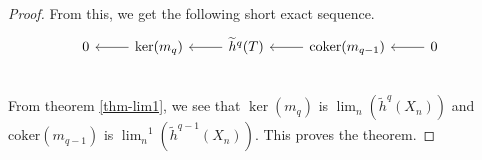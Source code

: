 \documentclass[12pt, notitlepage]{article}
\theoremstyle{definition}
\newcommand{\redco}{\widetilde{h}}
\newcommand{\coker}{\mathrm{coker}}
\begin{document}
\begin{proof}
  From this, we get the following short exact sequence.
  \[
    \begin{tikzcd}
      0 & \ker(m_q) \ar[l] & \redco^{q}(T) \ar[l] & \coker(m_{q-1}) \ar[l] & 0 \ar[l] \\
    \end{tikzcd}
  \]
  From theorem \ref{thm-lim1}, we see that $\ker(m_q)$ is $\lim_n(\redco^{q}(X_n))$ and
  $\coker(m_{q-1})$ is ${\lim_n}^1(\redco^{q-1}(X_n))$. This proves the theorem.

\end{proof}

%  
\end{document}
